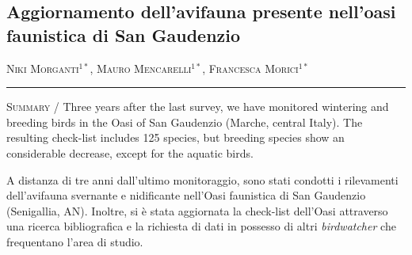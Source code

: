 \setcounter{figure}{0}
\setcounter{table}{0}

\begin{adjustwidth}{-3.5cm}{0cm}
\pagestyle{CIOpage}
\chapter*[L{\textquoteright}avifauna dell{\textquoteright}oasi
faunistica di San Gaudenzio]{\bfseries
Aggiornamento dell{\textquoteright}avifauna presente
nell{\textquoteright}oasi faunistica di San Gaudenzio}

\textsc{Niki Morganti}$^{1*}$, \textsc{Mauro Mencarelli}$^{1*}$,
\textsc{Francesca Morici}$^{1*}$  \\

  
\noindent\color{MUSEBLUE}\rule{27cm}{2pt}
\vspace{1cm}
\end{adjustwidth}


{\small
\noindent \textsc{\color{MUSEBLUE} Summary} / Three years after the last survey, we have monitored wintering and
breeding birds in the Oasi of San Gaudenzio (Marche, central Italy).
The resulting check-list includes 125 species, but breeding species
show an considerable decrease, except for the aquatic birds.\\
}

\vspace{1cm}
A distanza di tre anni dall{\textquoteright}ultimo monitoraggio, sono
stati condotti i rilevamenti dell{\textquoteright}avifauna svernante e
nidificante nell{\textquoteright}Oasi faunistica di San Gaudenzio
(Senigallia, AN). Inoltre, si \`e stata aggiornata la check-list
dell{\textquoteright}Oasi attraverso una ricerca bibliografica e la
richiesta di dati in possesso di altri \textit{birdwatcher} che
frequentano l{\textquoteright}area di studio. 

